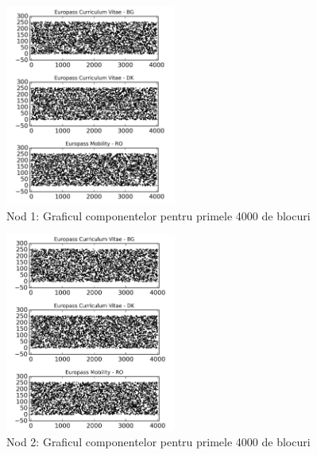 \documentclass[oneside, 12pt]{book}
\begin{document}
\begin{figure}[b!]
\begin{center}
\includegraphics[width=0.5\textwidth]{img/db1_c.png}    %
\caption{Nod 1: Graficul componentelor pentru primele 4000 de blocuri} 
\label{fig:db1_c}
\end{center}
\end{figure}

\begin{figure}[b!]
\begin{center}
\includegraphics[width=0.5\textwidth]{img/db2_c.png}    %
\caption{Nod 2: Graficul componentelor pentru primele 4000 de blocuri} 
\label{fig:db2_c}
\end{center}
\end{figure}
\end{document}
